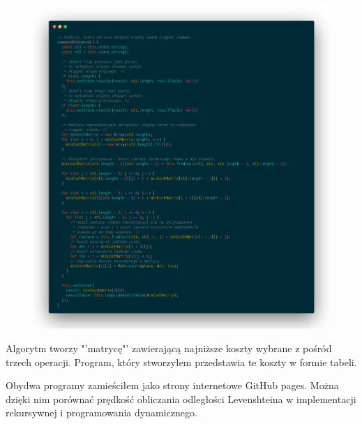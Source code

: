 \documentclass[a4paper,12pt]{article}
\begin{document}
\begin{figure}[H]
    \includegraphics[width=\textwidth]{dynamic.png}
\end{figure}

Algorytm tworzy "'matrycę"' zawierającą najniższe koszty wybrane
z pośród trzech operacji. Program, który stworzyłem przedstawia
te koszty w formie tabeli.

Obydwa programy zamieściłem jako strony internetowe GitHub pages.
Można dzięki nim porównać prędkość obliczania odległości Levenshteina
w implementacji rekursywnej i programowania dynamicznego.



\end{document}
